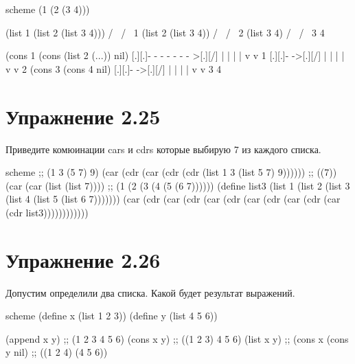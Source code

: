 \begin{codelisting}{scheme}
(1 (2 (3 4)))

(list 1 (list 2 (list 3 4)))
     /      \
    /        \
   1   (list 2 (list 3 4))
            /        \
           /          \
          2         (list 3 4)
                     /      \
                    /        \
                   3          4

(cons 1  (cons (list 2 (...)) nil)
     [.][.]- - - - - - - >[.][/]
      |                    |
      |                    |
      v                    v
      1                   [.][.]- ->[.][/]
                           |         |
                           |         |
                           v         v
                           2     (cons 3 (cons 4 nil)
                                    [.][.]- ->[.][/]
                                     |         |
                                     |         |
                                     v         v
                                     3         4
\end{codelisting}

\chapter{Упражнение 2.25}

Приведите комюинации cars и cdrs которые выбирую 7 из каждого списка.

\begin{codelisting}{scheme}
;; (1 3 (5 7) 9)
(car (cdr (car (cdr (cdr (list 1 3 (list 5 7) 9))))))
;; ((7))
(car (car (list (list 7))))
;; (1 (2 (3 (4 (5 (6 7))))))
(define list3 (list 1 (list 2 (list 3 (list 4 (list 5 (list 6 7)))))))
(car (cdr (car (cdr (car (cdr (car (cdr (car (cdr (car (cdr list3))))))))))))
\end{codelisting}

\chapter{Упражнение 2.26}

Допустим определили два списка. Какой будет результат выражений.

\begin{codelisting}{scheme}
(define x (list 1 2 3))
(define y (list 4 5 6))

(append x y)
;; (1 2 3 4 5 6)
(cons x y)
;; ((1 2 3) 4 5 6)
(list x y)
;; (cons x (cons y nil)
;; ((1 2 4) (4 5 6))
\end{codelisting}

